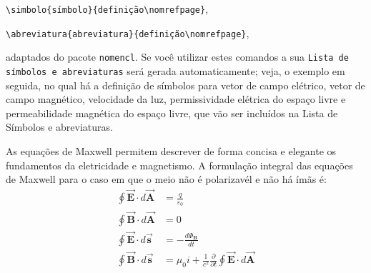 \noindent\verb|\simbolo{símbolo}{definição\nomrefpage}|,

\noindent\verb|\abreviatura{abreviatura}{definição\nomrefpage}|,

\noindent adaptados do pacote \texttt{nomencl}. Se você utilizar estes comandos a sua \texttt{Lista de símbolos e abreviaturas} será gerada automaticamente; veja, o exemplo em seguida, no qual há a definição de símbolos para vetor de campo elétrico, vetor de campo magnético, velocidade da luz, permissividade elétrica do espaço livre e permeabilidade magnética do espaço livre, que vão ser incluídos na Lista de Símbolos e abreviaturas.

As equações de Maxwell permitem descrever de forma concisa e elegante
os fundamentos da eletricidade e magnetismo. A formulação integral das
equações de Maxwell para o caso em que o meio não é polarizavél e não há ímãs é:%
\begin{align}
\oint\overrightarrow{\mathbf{E}}\cdot d\overrightarrow{\mathbf{A}}  &
=\frac{q}{\varepsilon_{0}}\\
\oint\overrightarrow{\mathbf{B}}\cdot d\overrightarrow{\mathbf{A}}  & =0\\
\oint\overrightarrow{\mathbf{E}}\cdot d\overrightarrow{\mathbf{s}}  &
=-\frac{d\Phi_{\mathbf{B}}}{dt}\\
\oint\overrightarrow{\mathbf{B}}\cdot d\overrightarrow{\mathbf{s}}  & =\mu
_{0}i+\frac{1}{c^{2}}\frac{\partial}{\partial t}\oint\overrightarrow
{\mathbf{E}}\cdot d\overrightarrow{\mathbf{A}}
\end{align}

%
%
%
%
%
%
%
%
%
%
%
%
%
%

